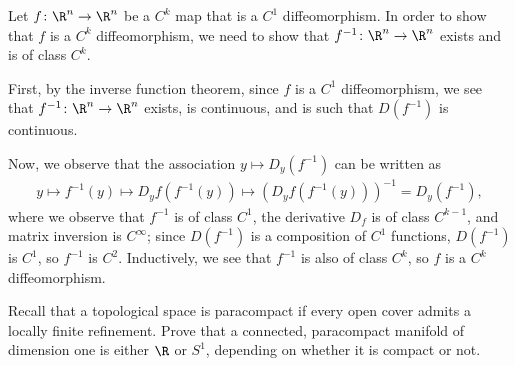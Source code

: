 \documentclass[10pt]{mypackage}
\begin{document}
\begin{solution}
  Let $f\colon \R^{n}\rightarrow \R^{n}$ be a $C^{k}$ map that is a $C^{1}$ diffeomorphism. In order to show that $f$ is a $C^{k}$ diffeomorphism, we need to show that $f^{-1}\colon \R^{n}\rightarrow \R^{n}$ exists and is of class $C^{k}$.\newline

  First, by the inverse function theorem, since $f$ is a $C^{1}$ diffeomorphism, we see that $f^{-1}\colon \R^{n}\rightarrow \R^{n}$ exists, is continuous, and is such that $D\left( f^{-1} \right)$ is continuous.\newline

  Now, we observe that the association $y\mapsto D_y\left( f^{-1} \right)$ can be written as
  \begin{align*}
    y \mapsto f^{-1}(y) \mapsto D_{y}f\left( f^{-1}(y) \right) \mapsto \left( D_yf\left( f^{-1}\left( y \right) \right) \right)^{-1} = D_y\left( f^{-1} \right),
  \end{align*}
  where we observe that $f^{-1}$ is of class $C^1$, the derivative $D_f$ is of class $C^{k-1}$, and matrix inversion is $C^{\infty}$; since $D\left( f^{-1} \right)$ is a composition of $C^{1}$ functions, $D\left( f^{-1} \right)$ is $C^{1}$, so $f^{-1}$ is $C^{2}$. Inductively, we see that $f^{-1}$ is also of class $C^{k}$, so $f$ is a $C^{k}$ diffeomorphism.
\end{solution}
\begin{problem}[Problem 4]
  Recall that a topological space is paracompact if every open cover admits a locally finite refinement. Prove that a connected, paracompact manifold of dimension one is either $\R$ or $S^{1}$, depending on whether it is compact or not.
\end{problem}
\end{document}
